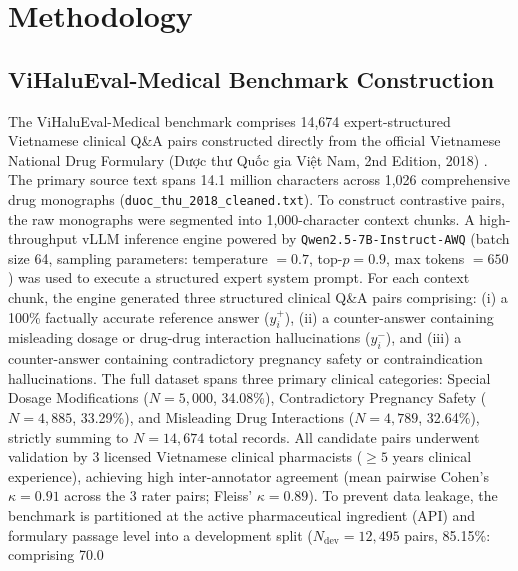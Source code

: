 \section{Methodology}

\subsection{ViHaluEval-Medical Benchmark Construction}
The ViHaluEval-Medical benchmark comprises 14,674 expert-structured Vietnamese clinical Q\&A pairs constructed directly from the official Vietnamese National Drug Formulary (Dược thư Quốc gia Việt Nam, 2nd Edition, 2018) \cite{ref6}. The primary source text spans 14.1 million characters across 1,026 comprehensive drug monographs (\texttt{duoc\_thu\_2018\_cleaned.txt}). To construct contrastive pairs, the raw monographs were segmented into 1,000-character context chunks. A high-throughput vLLM inference engine powered by \texttt{Qwen2.5-7B-Instruct-AWQ} (batch size 64, sampling parameters: temperature $= 0.7$, top-$p = 0.9$, max tokens $= 650$) was used to execute a structured expert system prompt. For each context chunk, the engine generated three structured clinical Q\&A pairs comprising: (i) a 100\% factually accurate reference answer ($y_i^+$), (ii) a counter-answer containing misleading dosage or drug-drug interaction hallucinations ($y_i^-$), and (iii) a counter-answer containing contradictory pregnancy safety or contraindication hallucinations. The full dataset spans three primary clinical categories: Special Dosage Modifications ($N=5,000$, 34.08\%), Contradictory Pregnancy Safety ($N=4,885$, 33.29\%), and Misleading Drug Interactions ($N=4,789$, 32.64\%), strictly summing to $N=14,674$ total records. All candidate pairs underwent validation by 3 licensed Vietnamese clinical pharmacists ($\ge 5$ years clinical experience), achieving high inter-annotator agreement (mean pairwise Cohen's $\kappa = 0.91$ across the 3 rater pairs; Fleiss' $\kappa = 0.89$). To prevent data leakage, the benchmark is partitioned at the active pharmaceutical ingredient (API) and formulary passage level into a development split ($N_{\text{dev}}=12,495$ pairs, 85.15\%: comprising 70.0%